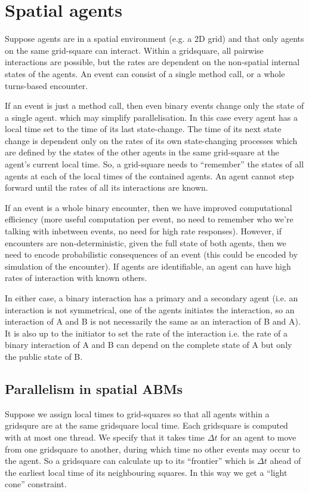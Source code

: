 \documentclass[a4paper]{article}
\begin{document}
\section{Spatial agents}

Suppose agents are in a spatial environment (e.g. a 2D grid) and that only agents on the same grid-square can interact. Within a gridsquare, all pairwise interactions are possible, but the rates are dependent on the non-spatial internal states of the agents. An event can consist of a single method call, or a whole turns-based encounter.

If an event is just a method call, then even binary events change only the state of a single agent. which may simplify parallelisation. In this case every agent has a local time set to the time of its last state-change. The time of its next state change is dependent only on the rates of its own state-changing processes which are defined by the states of the other agents in the same grid-square at the agent's current local time. So, a grid-square needs to ``remember'' the states of all agents at each of the local times of the contained agents. An agent cannot step forward until the rates of all its interactions are known.

If an event is a whole binary encounter, then we have improved computational efficiency (more useful computation per event, no need to remember who we're talking with inbetween events, no need for high rate responses). However, if encounters are non-deterministic, given the full state of both agents, then we need to encode probabilistic consequences of an event (this could be encoded by simulation of the encounter). If agents are identifiable, an agent can have high rates of interaction with known others.

In either case, a binary interaction has a primary and a secondary agent (i.e. an interaction is not symmetrical, one of the agents initiates the interaction, so an interaction of A and B is not necessarily the same as an interaction of B and A). It is also up to the initiator to set the rate of the interaction i.e. the rate of a binary interaction of A and B can depend on the complete state of A but only the public state of B.

\subsection{Parallelism in spatial ABMs}

Suppose we assign local times to grid-squares so that all agents within a gridsqure are at the same gridsquare local time. Each gridsquare is computed with at most one thread. We specify that it takes time $\Delta t$ for an agent to move from one gridsquare to another, during which time no other events may occur to the agent. So a gridsquare can calculate up to its ``frontier'' which is $\Delta t$ ahead of the earliest local time of its neighbouring squares. In this way we get a ``light cone'' constraint.
\end{document}
